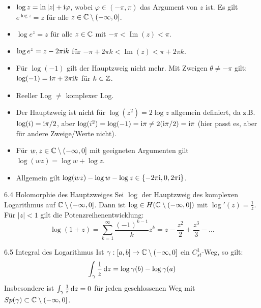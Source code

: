 \begin{tcolorbox}[colback=white, colframe=black!70, title={Bemerkung 6.2: Eigenschaften des Hauptzweiges}]
\begin{itemize}
    \item[i)] $\log z = \ln|z| + \mathrm{i} \varphi$, wobei $\varphi \in (-\pi, \pi)$ das Argument von $z$ ist. Es gilt $e^{\log z} = z$ für alle $z \in \mathbb{C} \setminus (-\infty, 0]$.
    \item[ii)] $\log e^z = z$ für alle $z \in \mathbb{C}$ mit $-\pi < \operatorname{Im}(z) < \pi$.
    \item[iii)] $\log e^z = z - 2\pi\mathrm{i} k$ für $-\pi + 2\pi k < \operatorname{Im}(z) < \pi + 2\pi k$.
    \item[iv)] Für $\log(-1)$ gilt der Hauptzweig nicht mehr. Mit Zweigen $\theta \neq -\pi$ gilt: $\log(-1) = \mathrm{i}\pi + 2\pi\mathrm{i} k$ für $k \in \mathbb{Z}$.
\end{itemize}
\end{tcolorbox}

\begin{tcolorbox}[colback=white, colframe=black!70, title={Bemerkung 6.3: Logarithmus-Rechenregeln}]
\begin{itemize}
    \item[i)] Reeller Log $\neq$ komplexer Log.
    \item[ii)] Der Hauptzweig ist nicht für $\log(z^2) = 2\log z$ allgemein definiert, da z.B. $\log(i) = \mathrm{i}\pi/2$, aber $\log(i^2) = \log(-1) = \mathrm{i}\pi \neq 2(\mathrm{i}\pi/2) = \mathrm{i}\pi$ (hier passt es, aber für andere Zweige/Werte nicht).
    \item[iii)] Für $w, z \in \mathbb{C} \setminus (-\infty, 0]$ mit geeigneten Argumenten gilt $\log(wz) = \log w + \log z$.
    \item[iv)] Allgemein gilt $\log(wz) - \log w - \log z \in \{-2\pi\mathrm{i}, 0, 2\pi\mathrm{i}\}$.
\end{itemize}
\end{tcolorbox}

\begin{satz}{6.4 Holomorphie des Hauptzweiges}
Sei $\log$ der Hauptzweig des komplexen Logarithmus auf $\mathbb{C} \setminus (-\infty, 0]$. Dann ist $\log \in H(\mathbb{C} \setminus (-\infty, 0])$ mit $\log'(z) = \frac{1}{z}$. 
Für $|z|<1$ gilt die Potenzreihenentwicklung:
\[
    \log(1+z) = \sum_{k=1}^\infty \frac{(-1)^{k-1}}{k} z^k = z - \frac{z^2}{2} + \frac{z^3}{3} - \dots
\]
\end{satz}

\begin{satz}{6.5 Integral des Logarithmus}
Ist $\gamma: [a,b] \to \mathbb{C} \setminus (-\infty, 0]$ ein $C_{st}^1$-Weg, so gilt:
\[
    \int_\gamma \frac{1}{z} \, \mathrm{d}z = \log \gamma(b) - \log \gamma(a)
\]
Insbesondere ist $\int_\gamma \frac{1}{z} \, \mathrm{d}z = 0$ für jeden geschlossenen Weg mit $Sp(\gamma) \subset \mathbb{C} \setminus (-\infty, 0]$.
\end{satz}


